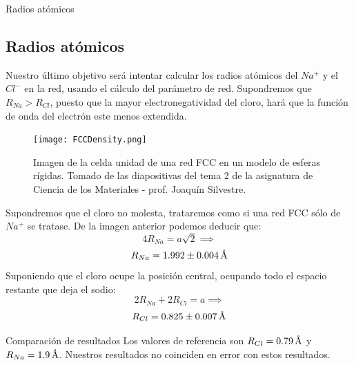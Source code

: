 \documentclass{beamer}
\begin{document}
\begin{frame}{Radios atómicos}
    \subsection{Radios atómicos}
    Nuestro último objetivo será intentar calcular los radios atómicos del $Na^+$ y el $Cl^-$ en la red, usando el cálculo del parámetro de red. Supondremos que $R_{Na} > R_{Cl}$, puesto que la mayor electronegatividad del cloro, hará que la función de onda del electrón este menos extendida.
    \begin{figure}[h!]
        \begin{center}
            \texttt{[image: FCCDensity.png]}
        \end{center}
        \caption{Imagen de la celda unidad de una red FCC en un modelo de esferas rígidas. Tomado de las diapositivas del tema 2 de la asignatura de Ciencia de los Materiales - prof. Joaquín Silvestre.}
    \end{figure}
\end{frame}
\begin{frame}
    Supondremos que el cloro no molesta, trataremos como si una red FCC sólo de $Na^+$ se tratase. De la imagen anterior podemos deducir que:
    $$
    4R_{Na} = a\sqrt{2} \implies
    $$
    \begin{equation}
        R_{Na} = 1.992 \pm 0.004 \, \text{\r{A}}
    \end{equation}
    Suponiendo que el cloro ocupe la posición central, ocupando todo el espacio restante que deja el sodio:
    $$
    2R_{Na} + 2R_{Cl} = a \implies
    $$
    \begin{equation}
        R_{Cl} = 0.825 \pm 0.007 \, \text{\r{A}}
    \end{equation}
    \begin{block}{Comparación de resultados}
        Los valores de referencia son $R_{Cl} = 0.79 \, \text{\r{A}}$ y $R_{Na} = 1.9 \, \text{\r{A}}$. Nuestros resultados no coinciden en error con estos resultados.
    \end{block}
\end{frame}
\end{document}
